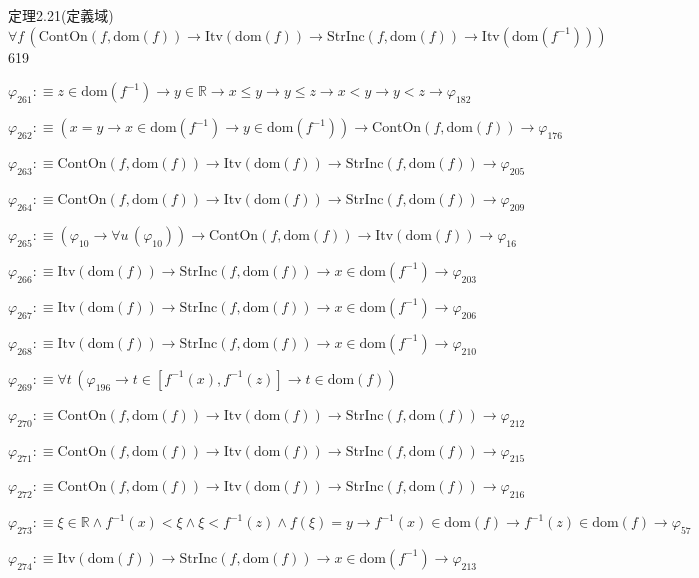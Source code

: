 \begin{fullproof}{定理2.21(定義域)}{$\forall f\,(\mathrm{ContOn}(f,\mathrm{dom}(f)) \to \mathrm{Itv}(\mathrm{dom}(f)) \to \mathrm{StrInc}(f,\mathrm{dom}(f)) \to \mathrm{Itv}(\mathrm{dom}(f^{-1})))$}{619}
\begin{abbrevlist}
\item $\varphi_{261} :\equiv z \in \mathrm{dom}(f^{-1}) \to y \in \mathbb{R} \to x \leq y \to y \leq z \to x < y \to y < z \to \varphi_{182}$
\item $\varphi_{262} :\equiv (x = y \to x \in \mathrm{dom}(f^{-1}) \to y \in \mathrm{dom}(f^{-1})) \to \mathrm{ContOn}(f,\mathrm{dom}(f)) \to \varphi_{176}$
\item $\varphi_{263} :\equiv \mathrm{ContOn}(f,\mathrm{dom}(f)) \to \mathrm{Itv}(\mathrm{dom}(f)) \to \mathrm{StrInc}(f,\mathrm{dom}(f)) \to \varphi_{205}$
\item $\varphi_{264} :\equiv \mathrm{ContOn}(f,\mathrm{dom}(f)) \to \mathrm{Itv}(\mathrm{dom}(f)) \to \mathrm{StrInc}(f,\mathrm{dom}(f)) \to \varphi_{209}$
\item $\varphi_{265} :\equiv (\varphi_{10} \to \forall u\,(\varphi_{10})) \to \mathrm{ContOn}(f,\mathrm{dom}(f)) \to \mathrm{Itv}(\mathrm{dom}(f)) \to \varphi_{16}$
\item $\varphi_{266} :\equiv \mathrm{Itv}(\mathrm{dom}(f)) \to \mathrm{StrInc}(f,\mathrm{dom}(f)) \to x \in \mathrm{dom}(f^{-1}) \to \varphi_{203}$
\item $\varphi_{267} :\equiv \mathrm{Itv}(\mathrm{dom}(f)) \to \mathrm{StrInc}(f,\mathrm{dom}(f)) \to x \in \mathrm{dom}(f^{-1}) \to \varphi_{206}$
\item $\varphi_{268} :\equiv \mathrm{Itv}(\mathrm{dom}(f)) \to \mathrm{StrInc}(f,\mathrm{dom}(f)) \to x \in \mathrm{dom}(f^{-1}) \to \varphi_{210}$
\item $\varphi_{269} :\equiv \forall t\,(\varphi_{196} \to t \in [f^{-1}(x),f^{-1}(z)] \to t \in \mathrm{dom}(f))$
\item $\varphi_{270} :\equiv \mathrm{ContOn}(f,\mathrm{dom}(f)) \to \mathrm{Itv}(\mathrm{dom}(f)) \to \mathrm{StrInc}(f,\mathrm{dom}(f)) \to \varphi_{212}$
\item $\varphi_{271} :\equiv \mathrm{ContOn}(f,\mathrm{dom}(f)) \to \mathrm{Itv}(\mathrm{dom}(f)) \to \mathrm{StrInc}(f,\mathrm{dom}(f)) \to \varphi_{215}$
\item $\varphi_{272} :\equiv \mathrm{ContOn}(f,\mathrm{dom}(f)) \to \mathrm{Itv}(\mathrm{dom}(f)) \to \mathrm{StrInc}(f,\mathrm{dom}(f)) \to \varphi_{216}$
\item $\varphi_{273} :\equiv \xi \in \mathbb{R} \land f^{-1}(x) < \xi \land \xi < f^{-1}(z) \land f(\xi) = y \to f^{-1}(x) \in \mathrm{dom}(f) \to f^{-1}(z) \in \mathrm{dom}(f) \to \varphi_{57}$
\item $\varphi_{274} :\equiv \mathrm{Itv}(\mathrm{dom}(f)) \to \mathrm{StrInc}(f,\mathrm{dom}(f)) \to x \in \mathrm{dom}(f^{-1}) \to \varphi_{213}$

\end{abbrevlist}
\end{fullproof}
